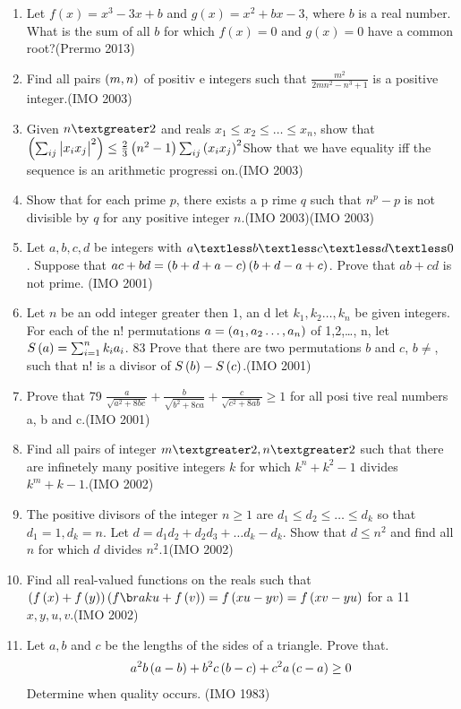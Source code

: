 \begin{enumerate}
\item Let $ f(x) = x^3 - 3x + b $ and $ g(x) = x^2 + bx - 3 $, where $ b $ is a real number. What is the sum of all $ b $ for which $ f(x) = 0 $ and $ g(x) = 0 $ have a common root?\hfill(Prermo 2013)
\item Find all pairs $\left(m,n\right)$ of positiv e integers such that $\frac{m^{2}}{2mn^{2}-n^{3}+1}$ is a positive integer.\hfill(IMO 2003)
 \item Given $n \textgreater 2$ and reals $x_{1} \leq x_{2} \leq \ldots\leq x_{n}$, show that $\left(\sum _{ij} \begin{vmatrix}x_ix_j\end{vmatrix}^2\right) \leq \frac{2}{3}\left(n^ 2-1\right)\sum_{ij} \left(x_ix_j\right)^2$Show that we have equality iff the sequence is an arithmetic progressi on.\hfill(IMO 2003)
 \item Show that for each prime $p$, there exists a p rime $q$ such that $n^{p}-p$ is not divisible by $q$ for any positive integer $n$.\hfill(IMO 2003)(IMO 2003)
 \item Let $a, b, c,d$ be integers with $a\textless b\textless c\textless d\textless 0$. Suppose that $ac+bd=\left(b+d+a-c\right)\left(b+d-a+c\right)$. Prove that $ab+cd$ is not prime. \hfill(IMO 2001)
\item Let $n$ be an odd integer greater then $1$, an d let $k_{1}, k_{2}\ldots,k_{n}$ be given integers. For each of the n! permutations  $a=\left(a_{1}, a _{2}\ldots,a_{n}\right)$ of 1,2,\ldots, n, let $S\left(a\right)=\sum_{i=1}^{n}k_{i}a_{i}$. 83 Prove that there are two permutations $b$ and $c$, $b\neq$, such that n! is a divisor of $S\left(b\right)-S\left(c\right)$.\hfill(IMO 2001)
\item Prove that 79 $\frac{a}{\sqrt{a^{2}+8bc}}+\frac{b}{\sqrt{b^{2}+8c a}}+\frac{c}{\sqrt{c^{2}+8ab}}\geq{1}$ for all posi tive real numbers a, b and c.\hfill(IMO 2001)
\item Find all pairs of integer $m \textgreater 2, n \textgreater 2$ such that there are infinetely many positive integers $k$ for which $k^{n}+k^{ 2}-1$ divides $k^{m}+k-1$.\hfill(IMO 2002)

\item The positive divisors of the integer $ n\geq 1$ are $d_{1}\leq d_{2}\leq \ldots \leq d_{k}$ so that $d_{1}=1, d_{k}=n$. Let $d=d_{1}d_{2}+d_{2 }d_{3}+\ldots d_{k}-d_{k}$. Show that $d\leq n^{2}$ and find all $n$ for which $d$ divides $n^{2}$.\hfil 1(IMO 2002)
\item Find all real-valued functions on the reals such that $\brak{f\brak{x}+f\brak{y}}\brak{f\b rak{u}+f\brak{v}}=f\brak{xu-yv}=f\brak{xv-yu}$ for a 11 $x,y,u,v$.\hfill(IMO 2002)
\item Let $a,b$ and $c$ be the lengths of the sides of a triangle. Prove that.
	\begin{align*} a^2b \left(a-b\right)+b^2c\left(b-c\right)+c^2a\left(c-a\right)\geq 0 \end{align*}	Determine when quality occurs. \hfill(IMO 1983)


\end{enumerate}
